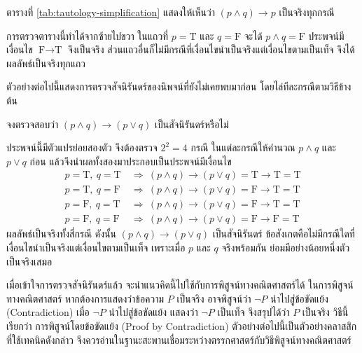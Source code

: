 ตารางที่ \ref{tab:tautology-simplification} แสดงให้เห็นว่า $(p \land q) \rightarrow p$ เป็นจริงทุกกรณี

การตรวจตารางนี้ทำได้จากซ้ายไปขวา ในแถวที่ $p=\text{T}$ และ $q=\text{F}$ จะได้ $p\land q=\text{F}$ ประพจน์มีเงื่อนไข $\text{F}\rightarrow\text{T}$ จึงเป็นจริง ส่วนแถวอื่นก็ไม่มีกรณีที่เงื่อนไขนำเป็นจริงแต่เงื่อนไขตามเป็นเท็จ จึงได้ผลลัพธ์เป็นจริงทุกแถว

ตัวอย่างต่อไปนี้แสดงการตรวจสัจนิรันดร์ของนิพจน์ที่ยังไม่เคยพบมาก่อน โดยไล่ทีละกรณีตามวิธีข้างต้น

\begin{ex}
\label{ex:check-tautology}
จงตรวจสอบว่า $(p \land q) \rightarrow (p \lor q)$ เป็นสัจนิรันดร์หรือไม่
\end{ex}

\begin{solution}
ประพจน์นี้มีตัวแปรย่อยสองตัว จึงต้องตรวจ $2^2 = 4$ กรณี ในแต่ละกรณีให้คำนวณ $p \land q$ และ $p \lor q$ ก่อน แล้วจึงนำผลทั้งสองมาประกอบเป็นประพจน์มีเงื่อนไข
\begin{align*}
p=\text{T},\ q=\text{T} &\ \Rightarrow\ (p \land q) \rightarrow (p \lor q) = \text{T} \rightarrow \text{T} = \text{T}\\
p=\text{T},\ q=\text{F} &\ \Rightarrow\ (p \land q) \rightarrow (p \lor q) = \text{F} \rightarrow \text{T} = \text{T}\\
p=\text{F},\ q=\text{T} &\ \Rightarrow\ (p \land q) \rightarrow (p \lor q) = \text{F} \rightarrow \text{T} = \text{T}\\
p=\text{F},\ q=\text{F} &\ \Rightarrow\ (p \land q) \rightarrow (p \lor q) = \text{F} \rightarrow \text{F} = \text{T}
\end{align*}
ผลลัพธ์เป็นจริงทั้งสี่กรณี ดังนั้น $(p \land q) \rightarrow (p \lor q)$ เป็นสัจนิรันดร์ ข้อสังเกตคือไม่มีกรณีใดที่เงื่อนไขนำเป็นจริงแต่เงื่อนไขตามเป็นเท็จ เพราะเมื่อ $p$ และ $q$ จริงพร้อมกัน ย่อมมีอย่างน้อยหนึ่งตัวเป็นจริงเสมอ \solhere
\end{solution}

เมื่อเข้าใจการตรวจสัจนิรันดร์แล้ว จะนำแนวคิดนี้ไปใช้กับการพิสูจน์ทางคณิตศาสตร์ได้ ในการพิสูจน์ทางคณิตศาสตร์ หากต้องการแสดงว่าข้อความ $P$ เป็นจริง อาจพิสูจน์ว่า $\neg P$ นำไปสู่ข้อขัดแย้ง (Contradiction) เมื่อ $\neg P$ นำไปสู่ข้อขัดแย้ง แสดงว่า $\neg P$ เป็นเท็จ จึงสรุปได้ว่า $P$ เป็นจริง วิธีนี้เรียกว่า การพิสูจน์โดยข้อขัดแย้ง (Proof by Contradiction) ตัวอย่างต่อไปนี้เป็นตัวอย่างคลาสสิกที่ใช้เทคนิคดังกล่าว จึงควรอ่านในฐานะสะพานเชื่อมระหว่างตรรกศาสตร์กับวิธีพิสูจน์ทางคณิตศาสตร์

